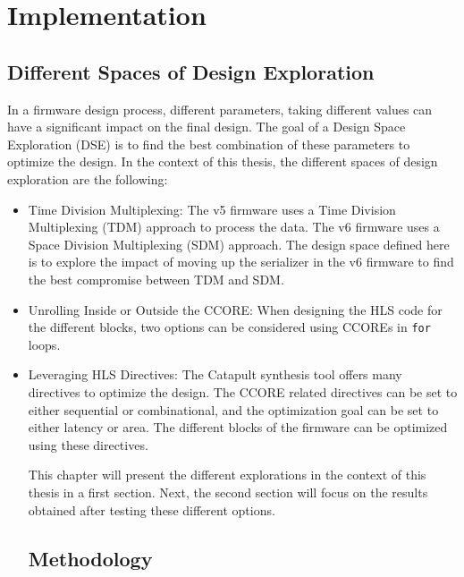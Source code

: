 \chapter{Implementation}\label{ch:implementation}

\section{Different Spaces of Design Exploration}

In a firmware design process, different parameters, taking different values can have a significant impact on the final design. The goal of a Design Space Exploration (DSE) is to find the best combination of these parameters to optimize the design. In the context of this thesis, the different spaces of design exploration are the following:
\begin{itemize}
    \item Time Division Multiplexing: The v5 firmware uses a Time Division Multiplexing (TDM) approach to process the data. The v6 firmware uses a Space Division Multiplexing (SDM) approach. The design space defined here is to explore the impact of moving up the serializer in the v6 firmware to find the best compromise between TDM and SDM.
    \item Unrolling Inside or Outside the CCORE: When designing the HLS code for the different blocks, two options can be considered using CCOREs in \verb|for| loops.
    \item Leveraging HLS Directives: The Catapult synthesis tool offers many directives to optimize the design. The CCORE related directives can be set to either sequential or combinational, and the optimization goal can be set to either latency or area. The different blocks of the firmware can be optimized using these directives.

This chapter will present the different explorations in the context of this thesis in a first section. Next, the second section will focus on the results obtained after testing these different options.


\section{Methodology}


\end{itemize}
